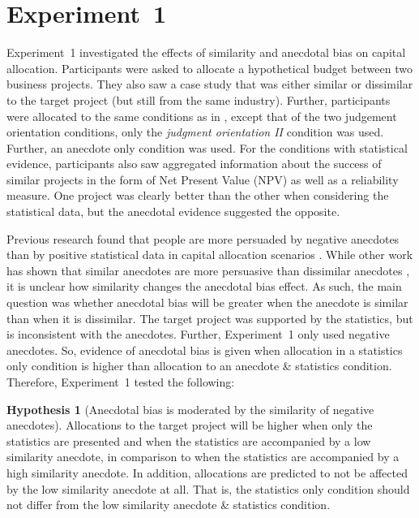 \documentclass[a4paper, nobind, dvipsnames]{templates/ociamthesis}
\theoremstyle{definition}
\theoremstyle{definition}
\theoremstyle{definition}
\theoremstyle{definition}
\newtheorem{hypothesis}{Hypothesis}[chapter]
\theoremstyle{remark}
\begin{document}
\hypertarget{anecdotes-1}{%
\section{Experiment~1}\label{anecdotes-1}}

Experiment~1 investigated the effects of similarity and anecdotal bias on
capital allocation. Participants were asked to allocate a hypothetical budget
between two business projects. They also saw a case study that was either
similar or dissimilar to the target project (but still from the same industry).
Further, participants were allocated to the same conditions as in \textcite{wainberg2018},
except that of the two judgement orientation conditions, only the \emph{judgment
orientation II} condition was used. Further, an anecdote only condition was
used. For the conditions with statistical evidence, participants also saw
aggregated information about the success of similar projects in the form of Net
Present Value (NPV) as well as a reliability measure. One project was clearly
better than the other when considering the statistical data, but the anecdotal
evidence suggested the opposite.

Previous research found that people are more persuaded by negative anecdotes
than by positive statistical data in capital allocation scenarios
\autocite{wainberg2018}. While other work has shown that similar anecdotes are more
persuasive than dissimilar anecdotes \autocite[Study 3]{hoeken2009}, it is unclear how
similarity changes the anecdotal bias effect. As such, the main question was
whether anecdotal bias will be greater when the anecdote is similar than when it
is dissimilar. The target project was supported by the statistics, but is
inconsistent with the anecdotes. Further, Experiment~1 only used negative
anecdotes. So, evidence of anecdotal bias is given when allocation in a
statistics only condition is higher than allocation to an anecdote \& statistics
condition. Therefore, Experiment~1 tested the following:

\begin{hypothesis}[Anecdotal bias is moderated by the similarity of negative anecdotes]
\protect\hypertarget{hyp:anecdote-similarity-anecdotes-1}{}{\label{hyp:anecdote-similarity-anecdotes-1} {} }Allocations to the target project will be higher when only the statistics are
presented and when the statistics are accompanied by a low similarity anecdote,
in comparison to when the statistics are accompanied by a high similarity
anecdote. In addition, allocations are predicted to not be affected by the low
similarity anecdote at all. That is, the statistics only condition should not
differ from the low similarity anecdote \& statistics condition.
\end{hypothesis}
\end{document}
